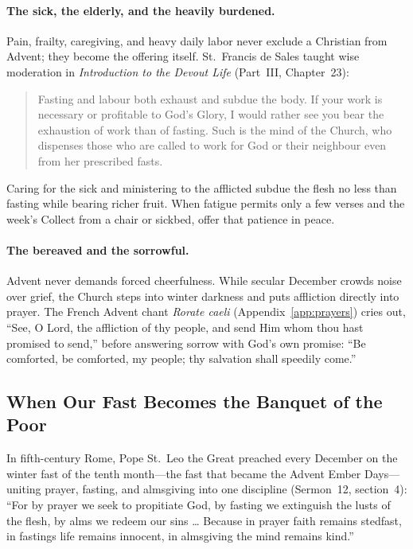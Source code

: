 \paragraph{The sick, the elderly, and the heavily burdened.}
Pain, frailty, caregiving, and heavy daily labor never exclude a Christian from Advent; they become the offering itself. St.~Francis de Sales taught wise moderation in \textit{Introduction to the Devout Life} (Part~III, Chapter~23):

\begin{quote}
Fasting and labour both exhaust and subdue the body. If your work is necessary or profitable to God's Glory, I would rather see you bear the exhaustion of work than of fasting. Such is the mind of the Church, who dispenses those who are called to work for God or their neighbour even from her prescribed fasts.
\end{quote}

Caring for the sick and ministering to the afflicted subdue the flesh no less than fasting while bearing richer fruit. When fatigue permits only a few verses and the week's Collect from a chair or sickbed, offer that patience in peace.

\paragraph{The bereaved and the sorrowful.}
Advent never demands forced cheerfulness. While secular December crowds noise over grief, the Church steps into winter darkness and puts affliction directly into prayer. The French Advent chant \textit{Rorate caeli} (Appendix~\ref{app:prayers}) cries out, ``See, O Lord, the affliction of thy people, and send Him whom thou hast promised to send,'' before answering sorrow with God's own promise: ``Be comforted, be comforted, my people; thy salvation shall speedily come.''

\subsection{When Our Fast Becomes the Banquet of the Poor}

In fifth-century Rome, Pope St.~Leo the Great preached every December on the winter fast of the tenth month---the fast that became the Advent Ember Days---uniting prayer, fasting, and almsgiving into one discipline (Sermon~12, section~4): ``For by prayer we seek to propitiate God, by fasting we extinguish the lusts of the flesh, by alms we redeem our sins \ldots{} Because in prayer faith remains stedfast, in fastings life remains innocent, in almsgiving the mind remains kind.''

